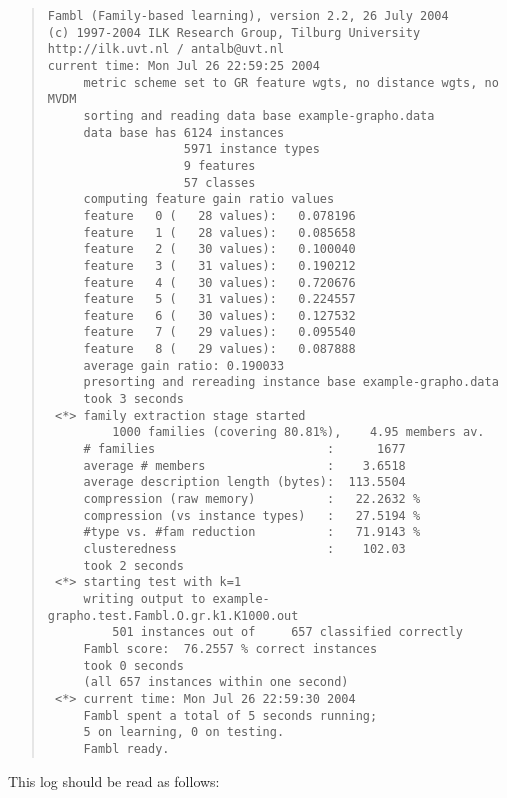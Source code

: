 \documentclass[11pt]{article}
\begin{document}
\begin{quote}
{\tiny
\begin{verbatim}
Fambl (Family-based learning), version 2.2, 26 July 2004
(c) 1997-2004 ILK Research Group, Tilburg University
http://ilk.uvt.nl / antalb@uvt.nl
current time: Mon Jul 26 22:59:25 2004
     metric scheme set to GR feature wgts, no distance wgts, no MVDM
     sorting and reading data base example-grapho.data
     data base has 6124 instances
                   5971 instance types
                   9 features
                   57 classes
     computing feature gain ratio values
     feature   0 (   28 values):   0.078196
     feature   1 (   28 values):   0.085658
     feature   2 (   30 values):   0.100040
     feature   3 (   31 values):   0.190212
     feature   4 (   30 values):   0.720676
     feature   5 (   31 values):   0.224557
     feature   6 (   30 values):   0.127532
     feature   7 (   29 values):   0.095540
     feature   8 (   29 values):   0.087888
     average gain ratio: 0.190033
     presorting and rereading instance base example-grapho.data
     took 3 seconds
 <*> family extraction stage started
         1000 families (covering 80.81%),    4.95 members av.
     # families                        :      1677
     average # members                 :    3.6518
     average description length (bytes):  113.5504
     compression (raw memory)          :   22.2632 %
     compression (vs instance types)   :   27.5194 %
     #type vs. #fam reduction          :   71.9143 %
     clusteredness                     :    102.03
     took 2 seconds
 <*> starting test with k=1
     writing output to example-grapho.test.Fambl.O.gr.k1.K1000.out
         501 instances out of     657 classified correctly
     Fambl score:  76.2557 % correct instances
     took 0 seconds
     (all 657 instances within one second)
 <*> current time: Mon Jul 26 22:59:30 2004
     Fambl spent a total of 5 seconds running;
     5 on learning, 0 on testing.
     Fambl ready.
\end{verbatim}
}
\end{quote}

This log should be read as follows:
\end{document}
